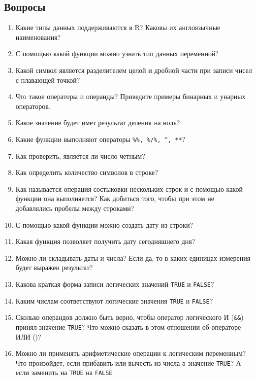 \documentclass[]{book}
\begin{document}
\subsection{Вопросы}

\begin{enumerate}
\def\labelenumi{\arabic{enumi}.}
\item
  Какие типы данных поддерживаются в R? Каковы их англоязычные
  наименования?
\item
  С помощью какой функции можно узнать тип данных переменной?
\item
  Какой символ является разделителем целой и дробной части при записи
  чисел с плавающей точкой?
\item
  Что такое операторы и операнды? Приведите примеры бинарных и унарных
  операторов.
\item
  Какое значение будет имет результат деления на ноль?
\item
  Какие функции выполняют операторы \texttt{\%\%,\ \%/\%,\ \^{},\ **}?
\item
  Как проверить, является ли число четным?
\item
  Как определить количество символов в строке?
\item
  Как называется операция состыковки нескольких строк и с помощью какой
  функции она выполняется? Как добиться того, чтобы при этом не
  добавлялись пробелы между строками?
\item
  С помощью какой функции можно создать дату из строки?
\item
  Какая функция позволяет получить дату сегодняшнего дня?
\item
  Можно ли складывать даты и числа? Если да, то в каких единицах
  измерения будет выражен результат?
\item
  Какова краткая форма записи логических значений \texttt{TRUE} и
  \texttt{FALSE}?
\item
  Каким числам соответствуют логические значения \texttt{TRUE} и
  \texttt{FALSE}?
\item
  Сколько операндов должно быть верно, чтобы оператор логического И
  (\texttt{\&\&}) принял значение \texttt{TRUE}? Что можно сказать в
  этом отношении об операторе ИЛИ (\texttt{\textbar{}\textbar{}})?
\item
  Можно ли применять арифметические операции к логическим переменным?
  Что произойдет, если прибавить или вычесть из числа \texttt{a}
  значение \texttt{TRUE}? А если заменить на \texttt{TRUE} на
  \texttt{FALSE}
\end{enumerate}
\end{document}
